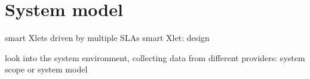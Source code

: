 \section{System model}

smart Xlets driven by multiple SLAs
smart Xlet: design 

look into the system environment, collecting data from different providers: system scope or system model 